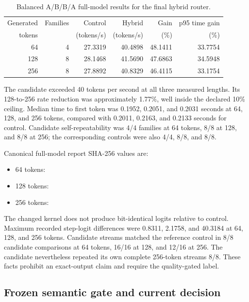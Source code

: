 \begin{table}[htbp]
\centering
\small
\begin{tabular}{r r r r r r}
\hline
Generated & Families & Control & Hybrid & Gain & p95 time gain \\
tokens & & (tokens/s) & (tokens/s) & (\%) & (\%) \\
\hline
64  & 4 & 27.3319 & 40.4898 & 48.1411 & 33.7754 \\
128 & 8 & 28.1468 & 41.5690 & 47.6863 & 34.5948 \\
256 & 8 & 27.8892 & 40.8329 & 46.4115 & 33.1754 \\
\hline
\end{tabular}
\caption{Balanced A/B/B/A full-model results for the final hybrid router.}
\label{tab:aion-hybrid-router-results}
\end{table}

The candidate exceeded 40 tokens per second at all three measured lengths.  Its
128-to-256 rate reduction was approximately 1.77\%, well inside the declared
10\% ceiling.  Median time to first token was 0.1952, 0.2051, and 0.2031 seconds
at 64, 128, and 256 tokens, compared with 0.2011, 0.2163, and 0.2133 seconds for
control.  Candidate self-repeatability was 4/4 families at 64 tokens, 8/8 at
128, and 8/8 at 256; the corresponding controls were also 4/4, 8/8, and 8/8.

Canonical full-model report SHA-256 values are:
\begin{itemize}
  \item 64 tokens:
  \item 128 tokens:
  \item 256 tokens:
\end{itemize}

The changed kernel does not produce bit-identical logits relative to control.
Maximum recorded step-logit differences were 0.8311, 2.1758, and 40.3184 at
64, 128, and 256 tokens.  Candidate streams matched the reference control in
8/8 candidate comparisons at 64 tokens, 16/16 at 128, and 12/16 at 256.  The
candidate nevertheless repeated its own complete 256-token streams 8/8.  These
facts prohibit an exact-output claim and require the quality-gated label.

\subsection{Frozen semantic gate and current decision}

